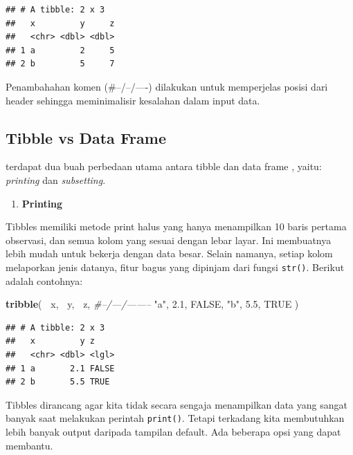 \documentclass[]{book}
\newenvironment{Shaded}{\begin{snugshade}}{\end{snugshade}}
\newcommand{\KeywordTok}[1]{\textcolor[rgb]{0.13,0.29,0.53}{\textbf{#1}}}
\newcommand{\FloatTok}[1]{\textcolor[rgb]{0.00,0.00,0.81}{#1}}
\newcommand{\StringTok}[1]{\textcolor[rgb]{0.31,0.60,0.02}{#1}}
\newcommand{\CommentTok}[1]{\textcolor[rgb]{0.56,0.35,0.01}{\textit{#1}}}
\newcommand{\OtherTok}[1]{\textcolor[rgb]{0.56,0.35,0.01}{#1}}
\newcommand{\OperatorTok}[1]{\textcolor[rgb]{0.81,0.36,0.00}{\textbf{#1}}}
\newcommand{\NormalTok}[1]{#1}
\providecommand{\tightlist}{%
  \setlength{\itemsep}{0pt}\setlength{\parskip}{0pt}}
\begin{document}
\begin{verbatim}
## # A tibble: 2 x 3
##   x         y     z
##   <chr> <dbl> <dbl>
## 1 a         2     5
## 2 b         5     7
\end{verbatim}

Penambahahan komen (\#--/--/----) dilakukan untuk memperjelas posisi
dari header sehingga meminimalisir kesalahan dalam input data.

\subsection{Tibble vs Data Frame}\label{tibble-vs-data-frame}

terdapat dua buah perbedaan utama antara tibble dan data frame , yaitu:
\emph{printing} dan \emph{subsetting}.

\begin{enumerate}
\def\labelenumi{\alph{enumi}.}
\tightlist
\item
  \textbf{Printing}
\end{enumerate}

Tibbles memiliki metode print halus yang hanya menampilkan 10 baris
pertama observasi, dan semua kolom yang sesuai dengan lebar layar. Ini
membuatnya lebih mudah untuk bekerja dengan data besar. Selain namanya,
setiap kolom melaporkan jenis datanya, fitur bagus yang dipinjam dari
fungsi \texttt{str()}. Berikut adalah contohnya:

\begin{Shaded}
\begin{Highlighting}[]
\KeywordTok{tribble}\NormalTok{(}
  \OperatorTok{~}\NormalTok{x, }\OperatorTok{~}\NormalTok{y, }\OperatorTok{~}\NormalTok{z,}
  \CommentTok{#--/---/--------}
  \StringTok{"a"}\NormalTok{, }\FloatTok{2.1}\NormalTok{, }\OtherTok{FALSE}\NormalTok{,}
  \StringTok{"b"}\NormalTok{, }\FloatTok{5.5}\NormalTok{, }\OtherTok{TRUE}
\NormalTok{)}
\end{Highlighting}
\end{Shaded}

\begin{verbatim}
## # A tibble: 2 x 3
##   x         y z    
##   <chr> <dbl> <lgl>
## 1 a       2.1 FALSE
## 2 b       5.5 TRUE
\end{verbatim}

Tibbles dirancang agar kita tidak secara sengaja menampilkan data yang
sangat banyak saat melakukan perintah \texttt{print()}. Tetapi terkadang
kita membutuhkan lebih banyak output daripada tampilan default. Ada
beberapa opsi yang dapat membantu.
\end{document}
